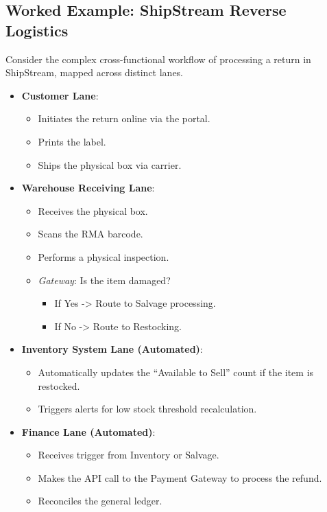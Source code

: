 \subsection{Worked Example: ShipStream Reverse
Logistics}\label{worked-example-shipstream-reverse-logistics}

Consider the complex cross-functional workflow of processing a return in
ShipStream, mapped across distinct lanes.

\begin{itemize}
\tightlist
\item
  \textbf{Customer Lane}:

  \begin{itemize}
  \tightlist
  \item
    Initiates the return online via the portal.
  \item
    Prints the label.
  \item
    Ships the physical box via carrier.
  \end{itemize}
\item
  \textbf{Warehouse Receiving Lane}:

  \begin{itemize}
  \tightlist
  \item
    Receives the physical box.
  \item
    Scans the RMA barcode.
  \item
    Performs a physical inspection.
  \item
    \emph{Gateway}: Is the item damaged?

    \begin{itemize}
    \tightlist
    \item
      If Yes -\textgreater{} Route to Salvage processing.
    \item
      If No -\textgreater{} Route to Restocking.
    \end{itemize}
  \end{itemize}
\item
  \textbf{Inventory System Lane (Automated)}:

  \begin{itemize}
  \tightlist
  \item
    Automatically updates the ``Available to Sell'' count if the item is
    restocked.
  \item
    Triggers alerts for low stock threshold recalculation.
  \end{itemize}
\item
  \textbf{Finance Lane (Automated)}:

  \begin{itemize}
  \tightlist
  \item
    Receives trigger from Inventory or Salvage.
  \item
    Makes the API call to the Payment Gateway to process the refund.
  \item
    Reconciles the general ledger.
  \end{itemize}
\end{itemize}


